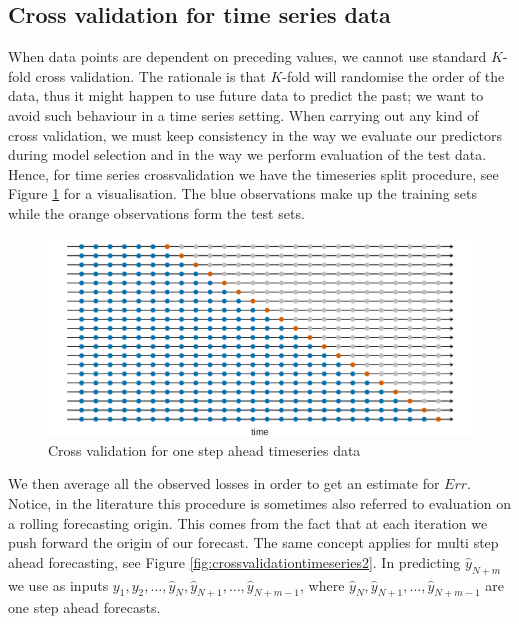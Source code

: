 \subsection{Cross validation for time series data}
When data points are dependent on preceding values, we cannot use standard $K$-fold cross validation. The rationale is that $K$-fold will randomise the order of the data, thus it might happen to use future data to predict the past; we want to avoid such behaviour in a time series setting. 
When carrying out any kind of cross validation, we must keep consistency in the way we evaluate our predictors during model selection and in the way we perform evaluation of the test data.
Hence, for time series crossvalidation we have the timeseries split procedure, see Figure \ref{fig:crossvalidationtimeseries} for a visualisation. The blue observations make up the training sets while the orange observations form the test sets.
\begin{figure}
    \includegraphics[width=\textwidth]{images/crossvalidationtimeseries.png}
    \caption{Cross validation for one step ahead timeseries data \cite{hyndman2018forecasting}}
    \label{fig:crossvalidationtimeseries}
\end{figure}
We then average all the observed losses in order to get an estimate for $Err$.
Notice, in the literature this procedure is sometimes also referred to evaluation on a rolling forecasting origin. This comes from the fact that at each iteration we push forward the origin of our forecast.
The same concept applies for multi step ahead forecasting, see Figure \ref{fig:crossvalidationtimeseries2}.
In predicting $\hat{y}_{N+m}$ we use as inputs $y_1, y_2, \dots, \hat{y}_{N},\hat{y}_{N+1},\dots, \hat{y}_{N+m-1}$, where $\hat{y}_{N},\hat{y}_{N+1},\dots, \hat{y}_{N+m-1}$ are one step ahead forecasts.
